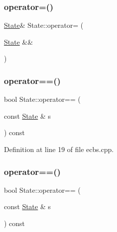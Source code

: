 \mbox{\label{struct_state_aa8d6ba634492b0c922f7dac1b87873c3}} 
\subsubsection{\texorpdfstring{operator=()}{operator=()}\hspace{0.1cm}{\footnotesize\ttfamily [4/4]}}
{\footnotesize\ttfamily \hyperlink{struct_state}{State}\& State\+::operator= (\begin{DoxyParamCaption}\item[{\hyperlink{struct_state}{State} \&\&}]{ }\end{DoxyParamCaption})\hspace{0.3cm}{\ttfamily [default]}}

\mbox{\label{struct_state_ad7c923d78b138998c9f9f9674fbdd93a}} 
\subsubsection{\texorpdfstring{operator==()}{operator==()}\hspace{0.1cm}{\footnotesize\ttfamily [1/4]}}
{\footnotesize\ttfamily bool State\+::operator== (\begin{DoxyParamCaption}\item[{const \hyperlink{struct_state}{State} \&}]{s }\end{DoxyParamCaption}) const\hspace{0.3cm}{\ttfamily [inline]}}



Definition at line 19 of file ecbs.\+cpp.

\mbox{\label{struct_state_ad7c923d78b138998c9f9f9674fbdd93a}} 
\subsubsection{\texorpdfstring{operator==()}{operator==()}\hspace{0.1cm}{\footnotesize\ttfamily [2/4]}}
{\footnotesize\ttfamily bool State\+::operator== (\begin{DoxyParamCaption}\item[{const \hyperlink{struct_state}{State} \&}]{s }\end{DoxyParamCaption}) const\hspace{0.3cm}{\ttfamily [inline]}}




